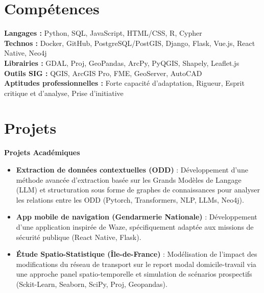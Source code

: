 \documentclass[11pt, a4paper]{article}
\begin{document}
\section*{Compétences}
\noindent \textbf{Langages :} Python, SQL, JavaScript, HTML/CSS, R, Cypher \\
\textbf{Technos :} Docker, GitHub, PostgreSQL/PostGIS, Django, Flask, Vue.js, React Native, Neo4j \\
\textbf{Librairies :} GDAL, Proj, GeoPandas, ArcPy, PyQGIS, Shapely, Leaflet.js \\
\textbf{Outils SIG :} QGIS, ArcGIS Pro, FME, GeoServer, AutoCAD \\
\textbf{Aptitudes professionnelles :} Forte capacité d’adaptation, Rigueur, Esprit critique et d'analyse, Prise d’initiative

\section*{Projets}

\noindent \textbf{Projets Académiques}
\begin{itemize}[leftmargin=0.5cm, nosep]
    \item \textbf{Extraction de données contextuelles (ODD)} : Développement d'une méthode avancée d'extraction basée sur les Grands Modèles de Langage (LLM) et structuration sous forme de graphes de connaissances pour analyser les relations entre les ODD (Pytorch, Transformers, NLP, LLMs, Neo4j).
    \item \textbf{App mobile de navigation (Gendarmerie Nationale)} : Développement d'une application inspirée de Waze, spécifiquement adaptée aux missions de sécurité publique (React Native, Flask).
\item \textbf{Étude Spatio-Statistique (Île-de-France)} : Modélisation de l'impact des modifications du réseau de transport sur le report modal domicile-travail via une approche panel spatio-temporelle et simulation de scénarios prospectifs (Sckit-Learn, Seaborn, SciPy, Proj, Geopandas).\end{itemize}
\end{document}
